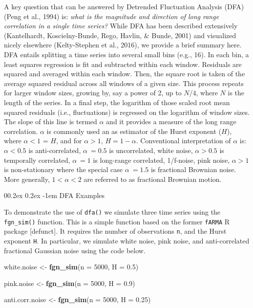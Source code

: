 \documentclass[
  man]{apa6}
\makeatletter
\newenvironment{Shaded}{\begin{snugshade}}{\end{snugshade}}
\newcommand{\AttributeTok}[1]{\textcolor[rgb]{0.13,0.29,0.53}{#1}}
\newcommand{\DecValTok}[1]{\textcolor[rgb]{0.00,0.00,0.81}{#1}}
\newcommand{\FloatTok}[1]{\textcolor[rgb]{0.00,0.00,0.81}{#1}}
\newcommand{\FunctionTok}[1]{\textcolor[rgb]{0.13,0.29,0.53}{\textbf{#1}}}
\newcommand{\NormalTok}[1]{#1}
\newcommand{\OtherTok}[1]{\textcolor[rgb]{0.56,0.35,0.01}{#1}}
\let\oldparagraph\paragraph
\renewcommand{\paragraph}[1]{\oldparagraph{#1}\mbox{}}
\renewcommand{\paragraph}{\@startsection{paragraph}{4}{\parindent}%
  {0\baselineskip \@plus 0.2ex \@minus 0.2ex}%
  {-1em}%
  {\normalfont\normalsize\bfseries\itshape\typesectitle}}
\makeatother
\begin{document}
A key question that can be answered by Detrended Fluctuation Analysis
(DFA) (Peng et al., 1994) is: \emph{what is the magnitude and
direction of long range correlation in a single time series?} While DFA
has been described extensively
(Kantelhardt, Koscielny-Bunde, Rego, Havlin, \& Bunde, 2001) and visualized nicely
elsewhere (Kelty-Stephen et al., 2016), we
provide a brief summary here. DFA entails splitting a time series into
several small bins (e.g., 16). In each bin, a least squares regression
is fit and subtracted within each window. Residuals are squared and
averaged within each window. Then, the square root is taken of the
average squared residual across all windows of a given size. This
process repeats for larger window sizes, growing by, say a power of 2,
up to \(N/4\), where \(N\) is the length of the series. In a final step, the
logarithm of those scaled root mean squared residuals (i.e.,
fluctuations) is regressed on the logarithm of window sizes. The slope
of this line is termed \(\alpha\) and it provides a measure of the long
range correlation. \(\alpha\) is commonly used an as estimator of the
Hurst exponent (\(H\)), where \(\alpha<1\) = \(H\), and for \(\alpha>1\),
\(H = 1 - \alpha\). Conventional interpretation of \(\alpha\) is:
\(\alpha < 0.5\) is anti-correlated, \(\alpha ~= 0.5\) is uncorrelated,
white noise, \(\alpha > 0.5\) is temporally correlated, \(\alpha ~= 1\) is
long-range correlated, 1/f-noise, pink noise, \(\alpha > 1\) is
non-stationary where the special case \(\alpha ~= 1.5\) is fractional
Brownian noise. More generally, \(1<\alpha<2\) are referred to as
fractional Brownian motion.

\hypertarget{dfa-examples}{%
\paragraph{DFA Examples}\label{dfa-examples}}

To demonstrate the use of \texttt{dfa()} we simulate three time series using
the \texttt{fgn\_sim()} function. This is a simple function based on the former
\texttt{fARMA} R package {[}defunct{]}. It requires the number of observations \texttt{n},
and the Hurst exponent \texttt{H}. In particular, we simulate white noise, pink
noise, and anti-correlated fractional Gaussian noise using the code
below.

\begin{Shaded}
\begin{Highlighting}[]
\NormalTok{white.noise }\OtherTok{\textless{}{-}} \FunctionTok{fgn\_sim}\NormalTok{(}\AttributeTok{n =} \DecValTok{5000}\NormalTok{, }\AttributeTok{H =} \FloatTok{0.5}\NormalTok{)}

\NormalTok{pink.noise }\OtherTok{\textless{}{-}} \FunctionTok{fgn\_sim}\NormalTok{(}\AttributeTok{n =} \DecValTok{5000}\NormalTok{, }\AttributeTok{H =} \FloatTok{0.9}\NormalTok{)}

\NormalTok{anti.corr.noise }\OtherTok{\textless{}{-}} \FunctionTok{fgn\_sim}\NormalTok{(}\AttributeTok{n =} \DecValTok{5000}\NormalTok{, }\AttributeTok{H =} \FloatTok{0.25}\NormalTok{)}
\end{Highlighting}
\end{Shaded}
\end{document}
